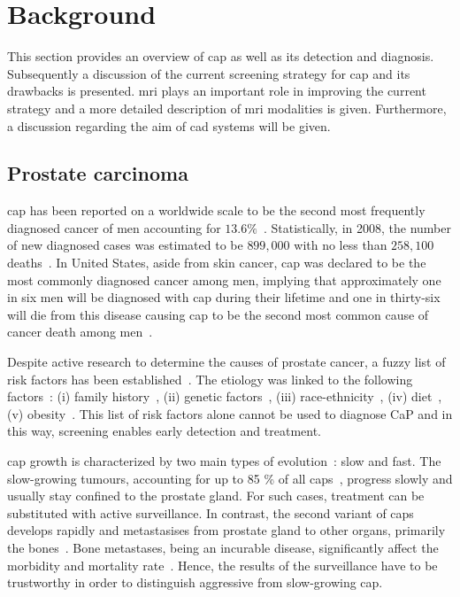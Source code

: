 \section{Background} \label{sec:background}
This section provides an overview of \ac{cap} as well as its detection and diagnosis. Subsequently a discussion of the current screening strategy for \ac{cap} and its drawbacks is presented. \ac{mri} plays an important role in improving the current strategy and a more detailed description of \ac{mri} modalities is given. Furthermore, a discussion regarding the aim of \ac{cad} systems will be given.

\subsection{Prostate carcinoma}\label{subsec:procar}

\ac{cap} has been reported on a worldwide scale to be the second most frequently diagnosed cancer of men accounting for $13.6 \%$~\cite{Ferlay2010}. Statistically, in 2008, the number of new diagnosed cases was estimated to be $899,000$ with no less than $258,100$ deaths~\cite{Ferlay2010}. In United States, aside from skin cancer, \ac{cap} was declared to be the most commonly diagnosed cancer among men, implying that approximately one in six men will be diagnosed with \ac{cap} during their lifetime and one in thirty-six will die from this disease causing \ac{cap} to be the second most common cause of cancer death among men~\cite{Siegel2013,Society2013}.

Despite active research to determine the causes of prostate cancer, a fuzzy list of risk factors has been established~\cite{Society2010}. The etiology was linked to the following factors~\cite{Society2010}: (i) family history~\cite{Giovannucci2007,Steinberg1990}, (ii) genetic factors~\cite{Freedman2006,Amundadottir2006,Agalliu2009}, (iii) race-ethnicity~\cite{Giovannucci2007,Hoffman2001}, (iv) diet~\cite{Giovannucci2007,Ma2009,Alexander2010}, (v) obesity~\cite{Giovannucci2007,Rodriguez2007}. This list of risk factors alone cannot be used to diagnose CaP and in this way, screening enables early detection and treatment.

\ac{cap} growth is characterized by two main types of evolution~\cite{Strum2005}: slow and fast. The slow-growing tumours, accounting for up to 85 \% of all \acp{cap}~\cite{Lu-Yao2009}, progress slowly and usually stay confined to the prostate gland. For such cases, treatment can be substituted with active surveillance. In contrast, the second variant of \acp{cap} develops rapidly and metastasises from prostate gland to other organs, primarily the bones~\cite{Oster2013}. Bone metastases, being an incurable disease, significantly affect the morbidity and mortality rate~\cite{Ye2007}. Hence, the  results of the surveillance have to be trustworthy in order to distinguish aggressive from slow-growing \ac{cap}.

